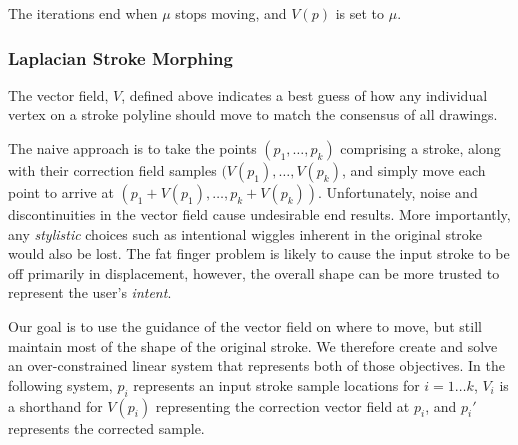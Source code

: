The iterations end when $\mu$ stops moving, and $V(p)$ is set to $\mu$.

\subsubsection{Laplacian Stroke Morphing}

The vector field, $V$, defined above indicates a best guess of how any individual vertex on a stroke polyline should move to match the consensus of all drawings.

The naive approach is to take the points $(p_1, \ldots, p_k)$ comprising a stroke, along with their correction field samples $(V(p_1), \ldots, V(p_k)$, and simply move each point to arrive at $(p_1 + V(p_1), \ldots, p_k + V(p_k))$.  Unfortunately, noise and discontinuities in the vector field cause undesirable end results. More importantly, any {\em stylistic} choices such as intentional wiggles inherent in the original stroke would also be lost. The fat finger problem is likely to cause the input stroke to be off primarily in displacement, however, the overall shape can be more trusted to represent the user's {\em intent}.

Our goal is to use the guidance of the vector field on where to move, but still maintain most of the shape of the original stroke.  We therefore create and solve an over-constrained linear system that represents both of those objectives.  In the following system, $p_i$ represents an input stroke sample locations for $i=1\ldots k$, $V_i$ is a shorthand for $V(p_i)$ representing the correction vector field at $p_i$, and $p_i'$ represents the corrected sample.

